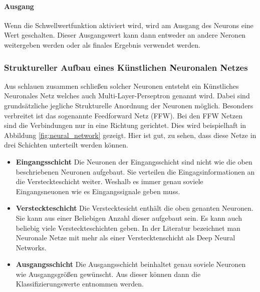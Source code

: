 \paragraph{Ausgang}
Wenn die Schwellwertfunktion aktiviert wird, wird am Ausgang des Neurons eine Wert geschalten. Dieser Ausgangswert kann dann entweder an andere Neronen weitergeben werden oder als finales Ergebnis verwendet werden.

\subsubsection{Struktureller Aufbau eines Künstlichen Neuronalen Netzes}
Aus schlauen zusammen schließen solcher Neuronen entsteht ein Künstliches Neuronales Netz welches auch Multi-Layer-Perseptron genannt wird. Dabei sind grundsätzliche jegliche Strukturelle Anordnung der Neuronen möglich. Besonders verbreitet ist das sogenannte Feedforward Netz (FFW).
Bei den FFW Netzen sind die Verbindungen nur in eine Richtung gerichtet. Dies wird beispielhaft in Abbildung \ref{fig:neural_network} gezeigt. Hier ist gut, zu sehen, dass diese Netze in drei Schichten unterteilt werden können.  
\begin{itemize}
\item \textbf{Eingangsschicht} Die Neuronen der Eingangsschicht sind nicht wie die oben beschriebenen Neuronen aufgebaut. Sie verteilen die Eingagsinformationen an die Versteckteschicht weiter. Weshalb es immer genau soviele Eingangsneuonen wie es Eingangssignale geben muss.

\item \textbf{Versteckteschicht}
Die Verstecktesicht enthält die oben genanten Neuronen. Sie kann aus einer Beliebigen Anzahl dieser aufgebaut sein. Es kann auch beliebig viele Versteckteschichten geben. In der Literatur bezeichnet man Neuronale Netze mit mehr als einer Verstecktenschicht als Deep Neural Networks.

\item \textbf{Ausgangsschicht}
Die Ausgangsschicht beinhaltet genau soviele Neuronen wie Ausgangsgrößen gewünscht.
Aus dieser können dann die Klassifizierungswerte entnommen werden.
\end{itemize}




